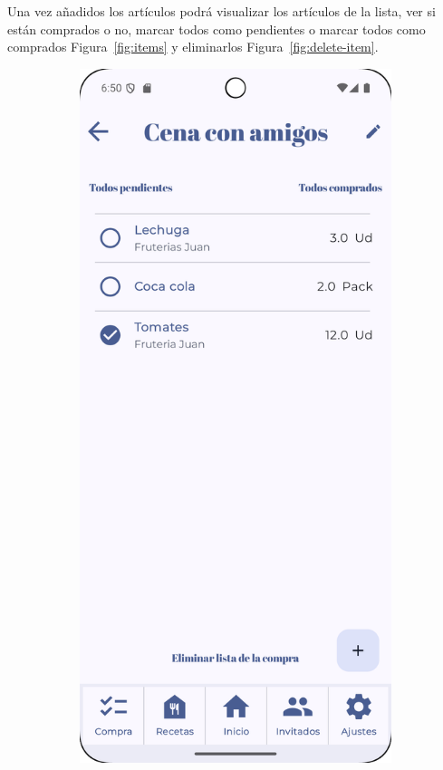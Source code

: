 Una vez añadidos los artículos podrá visualizar los artículos de la lista, ver si están comprados o no, marcar todos como pendientes o marcar todos como comprados Figura~\ref{fig:items} y eliminarlos Figura~\ref{fig:delete-item}.

\begin{figure}[H]
    \centering

    \begin{subfigure}[b]{0.3\textwidth}
      \includegraphics[width=\textwidth]{./img/manual/shopping_item_content.png}

\end{subfigure}
\end{figure}

